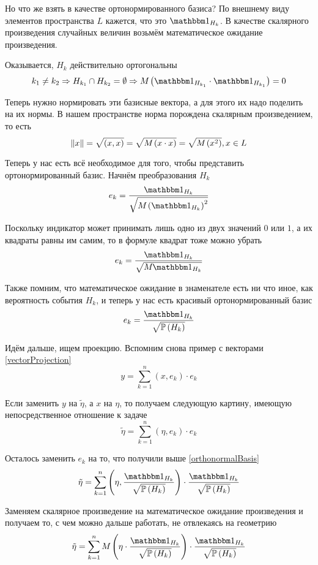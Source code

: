 Но что же взять в качестве ортонормированного базиса?
По внешнему виду элементов пространства $L$ кажется, что это $\indicatorof{H_k}$.
В качестве скалярного произведения случайных величин
возьмём математическое ожидание произведения.

Оказывается, $H_k$ действительно ортогональны
$$k_1 \neq k_2
    \Rightarrow H_{k_1} \cap H_{k_2} = \emptyset
    \Rightarrow
    \mean{\left( \indicatorof{H_{k_1}}\cdot \indicatorof{H_{k_1}} \right)} = 0$$

Теперь нужно нормировать эти базисные вектора,
а для этого их надо поделить на их нормы.
В нашем пространстве норма порождена скалярным произведением,
то есть
$$\left\| x \right\| = \sqrt{\left( x,x \right)}
    = \sqrt{M_{} \left( x \cdot x \right)}
    = \sqrt{M_{} \left( x^2 \right)}, x \in L$$

Теперь у нас есть всё необходимое для того,
чтобы представить ортонормированный базис.
Начнём преобразования $H_k$
$$e_k = \frac{\indicatorof{H_k}}
    {\sqrt{\mean{\left( \indicatorof{H_k} \right)^2}}}$$

Поскольку индикатор может принимать лишь одно из двух значений $0$ или $1$,
а их квадраты равны им самим, то в формуле квадрат тоже можно убрать
$$e_k = \frac{\indicatorof{H_k}}{\sqrt{\mean{\indicatorof{H_k}}}}$$

Также помним, что математическое ожидание в знаменателе есть ни что иное,
как вероятность события $H_k$,
и теперь у нас есть красивый ортонормированный базис
\begin{equation}\label{orthonormalBasis}
e_k = \frac{\indicatorof{H_k}}{\sqrt{\probability{H_k}}}
\end{equation}

Идём дальше, ищем проекцию.
Вспомним снова пример с векторами \eqref{vectorProjection}
$$y = \sum_{k=1}^n \left( x, e_k \right) \cdot e_k$$

Если заменить $y$ на $\tilde{\eta}$, а $x$ на $\eta$,
то получаем следующую картину, имеющую непосредственное отношение к задаче
$$\tilde{\eta} = \sum_{k=1}^n \left( \eta, e_k \right) \cdot e_k$$

Осталось заменить $e_k$ на то, что получили выше \eqref{orthonormalBasis}
$$\tilde{\eta}
    = \sum_{k=1}^n
        \left( \eta, \frac{\indicatorof{H_k}}{\sqrt{\probability{H_k}}} \right) 
        \cdot \frac{\indicatorof{H_k}}{\sqrt{\probability{H_k}}}$$

Заменяем скалярное произведение на математическое ожидание произведения
и получаем то, с чем можно дальше работать, не отвлекаясь на геометрию
$$\tilde{\eta}
    = \sum_{k=1}^n
        \mean{\left( \eta
            \cdot \frac{\indicatorof{H_k}}{\sqrt{\probability{H_k}}} \right)}
        \cdot \frac{\indicatorof{H_k}}{\sqrt{\probability{H_k}}}$$

